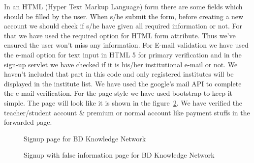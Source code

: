 \documentclass{scrreprt}
\begin{document}
In an HTML \big(Hyper Text Markup Language\big) form there are some fields which should be filled by the user. When s/he submit the form, before creating a new account we should check if s/he have given all required information or not. For that we have used the required option for HTML form attribute. Thus we've ensured the user won't miss any information. For E-mail validation we have used the e-mail option for text input in HTML 5 for primary verification and in the sign-up servlet we have checked if it is his/her institutional e-mail or not. We haven't included that part in this code and only registered institutes will be displayed in the institute list. We have used the google's mail API to complete the e-mail verification. For the page style we have used bootstrap to keep it simple. The page will look like it is shown in the figure~\ref{Signup}. We have verified the teacher/student account \& premium or normal account like payment stuffs in the forwarded page.
\begin{figure}[h]
\begin{center}
\end{center} 
\caption{Signup page for BD Knowledge Network\label{Signup}}
\end{figure}
\begin{figure}[h]
\begin{center}
\end{center} 
\caption{Signup with false information page for BD Knowledge Network\label{Signup}}
\end{figure}
\end{document}
